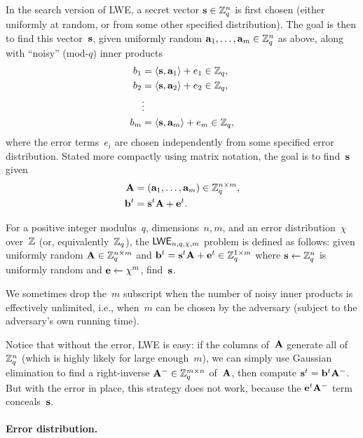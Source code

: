 \documentclass[11pt]{article}
\begin{document}
In the search version of LWE, a secret vector $\mathbf{s} \in \mathbb{Z}_q^{n}$ is
first chosen (either uniformly at random, or from some other specified
distribution). The goal is then to find this vector~$\mathbf{s}$, given
uniformly random $\mathbf{a}_{1}, \ldots, \mathbf{a}_{m} \in \mathbb{Z}_q^{n}$ as above,
along with ``noisy'' (mod-$q$) inner products
\begin{align*}
  b_1 &= \langle\mathbf{s},\mathbf{a}_1\rangle + e_1 \in \mathbb{Z}_q , \\
  b_2 &= \langle\mathbf{s},\mathbf{a}_2\rangle + e_2 \in \mathbb{Z}_q , \\
  &\vdots \\
  b_m &= \langle\mathbf{s},\mathbf{a}_m\rangle + e_m \in \mathbb{Z}_q ,
\end{align*}
where the error terms~$e_{i}$ are chosen independently from some
specified error distribution. Stated more compactly using matrix
notation, the goal is to find~$\mathbf{s}$ given
\begin{align*}
  \mathbf{A} &= (\mathbf{a}_1, \ldots, \mathbf{a}_m) \in \mathbb{Z}_q^{n \times m}, \\
  \mathbf{b}^t &= \mathbf{s}^t\mathbf{A} + \mathbf{e}^t .
\end{align*}

\begin{definition}
  \label{def:lwe-search}
  For a positive integer modulus~$q$, dimensions~$n,m$, and an error
  distribution~$\chi$ over~$\mathbb{Z}$ (or, equivalently~$\mathbb{Z}_q$), the
  $\mathsf{LWE}_{n,q,\chi,m}$ problem is defined as follows: given uniformly
  random $\mathbf{A} \in \mathbb{Z}_q^{n \times m}$ and
  $\mathbf{b}^{t} = \mathbf{s}^{t} \mathbf{A} + \mathbf{e}^{t} \in \mathbb{Z}_q^{1 \times m}$ where
  $\mathbf{s} \gets \mathbb{Z}_q^{n}$ is uniformly random and
  $\mathbf{e} \gets \chi^{m}$, find~$\mathbf{s}$.

  We sometimes drop the~$m$ subscript when the number of noisy inner
  products is effectively unlimited, i.e., when~$m$ can be chosen by
  the adversary (subject to the adversary's own running time).
\end{definition}

Notice that without the error, LWE is easy: if the columns of~$\mathbf{A}$
generate all of~$\mathbb{Z}_q^{n}$ (which is highly likely for large
enough~$m$), we can simply use Gaussian elimination to find a
right-inverse $\mathbf{A}^{-} \in \mathbb{Z}_q^{m \times n}$ of~$\mathbf{A}$, then
compute $\mathbf{s}^{t} = \mathbf{b}^{t} \mathbf{A}^{-}$. But with the error in
place, this strategy does not work, because the $\mathbf{e}^{t} \mathbf{A}^{-}$
term conceals~$\mathbf{s}$.

\paragraph{Error distribution.}
\end{document}
